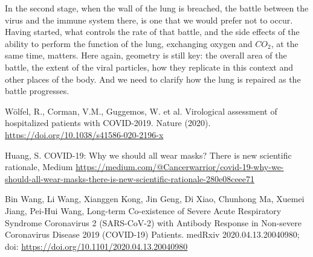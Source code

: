 \documentclass[onecolumn,journal]{IEEEtran}
\begin{document}
\begin{multicols}{2}
In the second stage, when the wall of the lung is breached, the battle between the virus and the immune system there, is one that we would prefer not to occur. Having started, what controls the rate of that battle, and the side effects of the ability to perform the function of the lung, exchanging oxygen and $CO_2$, at the same time, matters. Here again, geometry is still key: the overall area of the battle, the extent of the viral particles, how they replicate in this context and other places of the body. And we need to clarify how the lung is repaired as the battle progresses. 

\end{multicols}

\begin{thebibliography}{20}

  W\"olfel, R., Corman, V.M., Guggemos, W. et al. Virological assessment of hospitalized patients with COVID-2019. Nature (2020). \url{https://doi.org/10.1038/s41586-020-2196-x}

 Huang, S. COVID-19: Why we should all wear masks? There is new scientific rationale, Medium \url{https://medium.com/@Cancerwarrior/covid-19-why-we-should-all-wear-masks-there-is-new-scientific-rationale-280e08ceee71}

 Bin Wang, Li Wang, Xianggen Kong, Jin Geng, Di Xiao, Chunhong Ma, Xuemei Jiang, Pei-Hui Wang, Long-term Co-existence of Severe Acute Respiratory Syndrome Coronavirus 2 (SARS-CoV-2) with Antibody Response in Non-severe Coronavirus Disease 2019 (COVID-19) Patients. medRxiv 2020.04.13.20040980; doi: \url{https://doi.org/10.1101/2020.04.13.20040980}


\end{thebibliography}
\end{document}
